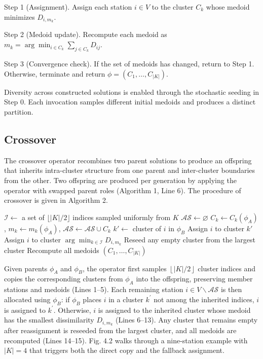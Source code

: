 \documentclass[11pt]{article}
\numberwithin{table}{section}
\numberwithin{figure}{section}
\begin{document}
Step 1 (Assignment). Assign each station $i\in V$ to the cluster ${{C}_{k}}$ whose medoid minimizes ${{D}_{i,{{m}_{k}}}}$.

Step 2 (Medoid update). Recompute each medoid as ${{m}_{k}}=\arg {{\min }_{i\in {{C}_{k}}}}\sum\limits_{j\in {{C}_{k}}}{{{D}_{ij}}}$.

Step 3 (Convergence check). If the set of medoids has changed, return to Step 1. Otherwise, terminate and return $\phi =({{C}_{1}},\ldots ,{{C}_{\left| K \right|}})$.

Diversity across constructed solutions is enabled through the stochastic seeding in Step 0. Each invocation samples different initial medoids and produces a distinct partition.

\subsection{Crossover}

The crossover operator recombines two parent solutions to produce an offspring that inherits intra-cluster structure from one parent and inter-cluster boundaries from the other. Two offspring are produced per generation by applying the operator with swapped parent roles (Algorithm 1, Line 6). The procedure of crossover is given in Algorithm 2.

\begin{algorithm}[htbp]
\caption{Crossover$(\phi_A,\phi_B)$}
\label{alg:crossover}
\begin{algorithmic}[1]
\State $\mathcal{I}\leftarrow$ a set of $\lfloor |K|/2\rfloor$ indices sampled uniformly from $K$
\State $\mathcal{AS}\leftarrow\varnothing$ 
\State $C_k\leftarrow C_k(\phi_A)$, $m_k\leftarrow m_k(\phi_A)$, $\mathcal{AS}\leftarrow\mathcal{AS}\cup C_k$
\EndFor
{}
\State $k'\leftarrow$ cluster of $i$ in $\phi_B$
\State Assign $i$ to cluster $k'$
\Else
\State Assign $i$ to cluster $\arg\min_{k\in\mathcal{I}}D_{i,m_k}$
\EndIf
\EndFor
\State Reseed any empty cluster from the largest cluster
\State Recompute all medoids
\State \Return $(C_1,\ldots,C_{|K|})$
\end{algorithmic}
\end{algorithm}

Given parents ${{\phi }_{A}}$ and ${{\phi }_{B}}$, the operator first samples $\left\lfloor \left| K \right|/2 \right\rfloor $ cluster indices and copies the corresponding clusters from ${{\phi }_{A}}$ into the offspring, preserving member stations and medoids (Lines 1–5). Each remaining station $i\in V\backslash \mathcal{A}\mathcal{S}$ is then allocated using ${{\phi }_{B}}$: if ${{\phi }_{B}}$ places $i$ in a cluster ${{k}^{\prime }}$ not among the inherited indices, $i$ is assigned to ${{k}^{\prime }}$. Otherwise, $i$ is assigned to the inherited cluster whose medoid has the smallest dissimilarity ${{D}_{i,{{m}_{k}}}}$ (Lines 6–13). Any cluster that remains empty after reassignment is reseeded from the largest cluster, and all medoids are recomputed (Lines 14–15). Fig. 4.2 walks through a nine-station example with $\left|K\right|=4$ that triggers both the direct copy and the fallback assignment.
\end{document}
